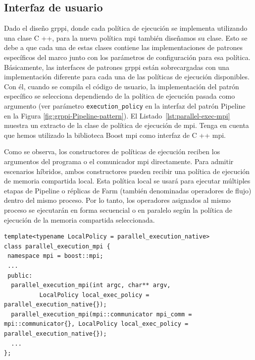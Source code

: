 \subsection{Interfaz de usuario}
\label{sec:interfaz_usuario}

Dado el diseño \acrshort{grppi}, donde cada política de ejecución se implementa utilizando una clase C ++, para la nueva política \acrshort{mpi} también diseñamos su clase. Esto se debe a que cada una de estas clases contiene las implementaciones de patrones específicos del marco junto con los parámetros de configuración para esa política. Básicamente, las interfaces de patrones \acrshort{grppi} están sobrecargadas con una implementación diferente para cada una de las políticas de ejecución disponibles. Con él, cuando se compila el código de usuario, la implementación del patrón específico se selecciona dependiendo de la política de ejecución pasada como argumento (ver parámetro \texttt{execution\_policy} en la interfaz del patrón Pipeline en la Figura \ref{fig:grppi-Pipeline-pattern}). El Listado~\ref{lst:parallel-exec-mpi} muestra un extracto de la clase de política de ejecución de \acrshort{mpi}. Tenga en cuenta que hemos utilizado la biblioteca Boost \acrshort{mpi} \cite{boost-mpi} como interfaz de C ++ \acrshort{mpi}. 

Como se observa, los constructores de políticas de ejecución reciben los argumentos del programa o el comunicador \acrshort{mpi} directamente. Para admitir escenarios híbridos, ambos constructores pueden recibir una política de ejecución de memoria compartida local. Esta política local se usará para ejecutar múltiples etapas de Pipeline o réplicas de Farm (también denominadas operadores de flujo) dentro del mismo proceso. Por lo tanto, los operadores asignados al mismo proceso se ejecutarán en forma secuencial o en paralelo según la política de ejecución de la memoria compartida seleccionada. 

\vspace{0.35cm}
\begin{lstlisting}[linewidth=1\columnwidth,caption={Clase de política de ejecución \acrshort{mpi} en \acrshort{grppi}.},label=lst:parallel-exec-mpi,frame=single]
template<typename LocalPolicy = parallel_execution_native>
class parallel_execution_mpi {
 namespace mpi = boost::mpi;
 ...
 public:
  parallel_execution_mpi(int argc, char** argv, 
          LocalPolicy local_exec_policy = parallel_execution_native{});
  parallel_execution_mpi(mpi::communicator mpi_comm = mpi::communicator{}, LocalPolicy local_exec_policy = parallel_execution_native{});
  ...                           
};
\end{lstlisting}
\vspace{0.35cm}

